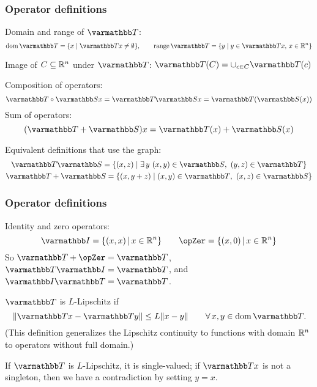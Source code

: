 \documentclass[10pt,mathserif]{beamer}
\begin{document}
\begin{frame}
\frametitle{Operator definitions}

Domain and range of $\opT$:
\[
\dom \opT = \{ x\;|\; \opT x\ne \emptyset\},
\qquad
\range \opT = \{ y\;|\; y\in \opT x,\,x\in \reals^n\}
\]

Image of $C \subseteq \mathbb{R}^n$ under $\opT$:
 $\opT(C) =  \cup_{c \in C} \opT(c)$
 \vspace{0.2in}


Composition of operators:
\[
\opT \circ\opS x =\opT \opS x = \opT(\opS (x))
\]
Sum of operators:
\[
(\opT +\opS )x = \opT (x)+\opS (x)
\]

Equivalent definitions that use the graph:
\begin{gather*}
\opT \opS  = \{(x,z) \;|\; \exists\,  y~(x,y)\in \opS ,~(y,z)\in  \opT  \}\\
\opT +\opS  = \{(x,y+z) \;|\; (x,y)\in  \opT ,~(x,z)\in  \opS  \}
\end{gather*}
\end{frame}

\begin{frame}
\frametitle{Operator definitions}
 Identity and zero operators:
\[
\opI = \{(x,x)\,|\,x\in \reals^n\}
\qquad
\opZer= \{(x,0)\,|\,x\in \reals^n\}
\]
So $\opT +\opZer=\opT $, $\opT \opI =\opT $, and $\opI \opT =\opT $.
\vspace{0.2in}

$\opT$ is $L$-Lipschitz if
\[
\|\opT x-\opT y\| \leq L \|x-y\|\qquad \forall\,x,y\in \dom \opT.
\]
(This definition generalizes the Lipschitz continuity to functions with domain $\mathbb{R}^n$ to operators without full domain.)

\vspace{0.2in}
If $\opT $ is $L$-Lipschitz, it is single-valued; if $\opT x$ is not a singleton, then we have a contradiction by setting $y=x$.
\end{frame}
\end{document}
